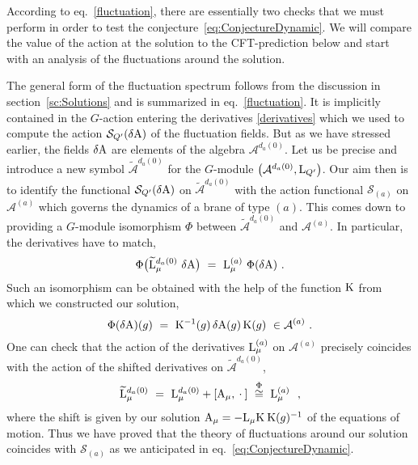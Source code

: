 \documentclass[12pt,a4paper]{article}
\newcommand{\mc}{\mathcal} %
\def\tK{{\rm K}} %
\def\cS{{\mathcal S}}
\def\tA{{\rm A}}
\def\tL{{\rm L}}
\begin{document}
According to eq.~\eqref{fluctuation}, there are essentially two 
checks that we must perform in order to test the 
conjecture~\eqref{eq:ConjectureDynamic}. We will compare the 
value of the action at the solution to the CFT-prediction 
below and start with an analysis of the fluctuations around 
the solution. 
\smallskip

The general form of the fluctuation spectrum follows from the 
discussion in section~\ref{sc:Solutions} and is summarized in 
eq.~\eqref{fluctuation}.
It is implicitly contained in the $G$-action entering the derivatives
\eqref{derivatives} which we used to compute the
action $\cS_{Q'}(\delta \tA)$ of the fluctuation fields. But as
we have stressed earlier, the fields $\delta \tA$ are elements of 
the algebra $\mc{A}^{d_a(0)}$. Let us be precise and introduce 
a new symbol $\widetilde{\mc{A}}^{d_a(0)}$ for the $G$-module 
$\bigl(\mc{A}^{d_a(0)},\tL_{Q^\prime}\bigr)$. Our aim then is to identify 
the functional $\cS_{Q'}(\delta \tA)$ on $\widetilde{\mc{A}}^{d_a(0)}$ 
with the action functional $\cS_{(a)}$ on $\mc{A}^{(a)}$ which 
governs the dynamics of a brane of type $(a)$. This comes down 
to providing a $G$-module isomorphism $\Phi$ between 
$\widetilde{\mc{A}}^{d_a(0)}$ and $\mc{A}^{(a)}$. In particular, 
the derivatives have to match,
\begin{equation*}
\Phi\bigl(\widetilde{\tL}_\mu^{d_a(0)}\ \delta \tA\bigr)\ =\ \tL_\mu^{(a)}
\ \Phi(\delta \tA)\ .
\end{equation*}
Such an isomorphism can be obtained with the help of the function $\tK$ 
from which we constructed our solution,
\begin{equation*}
\Phi(\delta \tA)(g)\ =\ \tK^{-1} (g)
  \, \delta \tA(g) \, \tK (g) \ \in \mc{A}^{(a)} \ . 
\end{equation*}
One can check that the action of the derivatives $\tL_\mu^{(a)}$ 
on $\mc{A}^{(a)}$ precisely coincides with the action of the shifted
derivatives on $\widetilde{\mc{A}}^{d_a(0)}$,
$$\widetilde{\tL}_\mu^{d_a(0)} \ =\ \tL_\mu^{d_a(0)}+
 [\tA_\mu,\:\cdot\:]\ \overset{\Phi}{\cong}\ \tL_\mu^{(a)}\ \ ,$$ 
where the shift is given by our solution
$\tA_{\mu}=-\tL_{\mu}\tK\:\tK(g)^{-1}$ of the 
equations of motion. Thus we have proved that the theory of fluctuations 
around our solution coincides with $\cS_{(a)}$ as we anticipated in 
eq.~\eqref{eq:ConjectureDynamic}.  
\medskip
\end{document}
